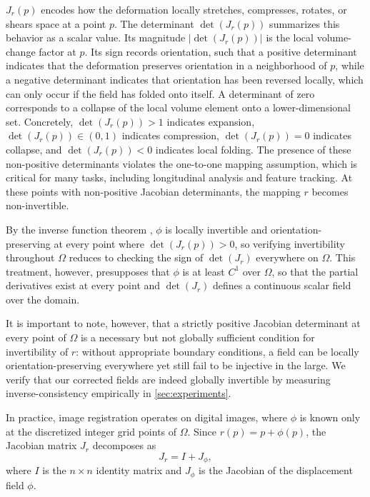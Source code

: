 \documentclass[lettersize,journal]{IEEEtran}
\begin{document}
$J_r(p)$ encodes how the deformation locally stretches, compresses, rotates, or shears space at a point $p$. The determinant $\det(J_r(p))$ summarizes this behavior as a scalar value. Its magnitude $|\det(J_r(p))|$ is the local volume-change factor at $p$. Its sign records orientation, such that a positive determinant indicates that the deformation preserves orientation in a neighborhood of $p$, while a negative determinant indicates that orientation has been reversed locally, which can only occur if the field has folded onto itself. A determinant of zero corresponds to a collapse of the local volume element onto a lower-dimensional set. Concretely, $\det(J_r(p)) > 1$ indicates expansion, $\det(J_r(p)) \in (0,1)$ indicates compression, $\det(J_r(p)) = 0$ indicates collapse, and $\det(J_r(p)) < 0$ indicates local folding. The presence of these non-positive determinants violates the one-to-one mapping assumption, which is critical for many tasks, including longitudinal analysis and feature tracking. At these points with non-positive Jacobian determinants, the mapping $r$ becomes non-invertible.

By the inverse function theorem \cite{implicit_function_theorem}, $\phi$ is locally invertible and orientation-preserving at every point where $\det(J_r(p)) > 0$, so verifying invertibility throughout $\Omega$ reduces to checking the sign of $\det(J_r)$ everywhere on $\Omega$. This treatment, however, presupposes that $\phi$ is at least $C^1$ over $\Omega$, so that the partial derivatives exist at every point and $\det(J_r)$ defines a continuous scalar field over the domain.

It is important to note, however, that a strictly positive Jacobian determinant at every point of $\Omega$ is a necessary but not globally sufficient condition for invertibility of $r$: without appropriate boundary conditions, a field can be locally orientation-preserving everywhere yet still fail to be injective in the large. We verify that our corrected fields are indeed globally invertible by measuring inverse-consistency empirically in \autoref{sec:experiments}.

In practice, image registration operates on digital images, where $\phi$ is known only at the discretized integer grid points of $\Omega$. Since $r(p) = p + \phi(p)$, the Jacobian matrix $J_r$ decomposes as
\begin{equation} \label{eq:jacobian_decomposition}
    J_r = I + J_\phi,
\end{equation}
where $I$ is the $n \times n$ identity matrix and $J_\phi$ is the Jacobian of the displacement field $\phi$.
\end{document}

